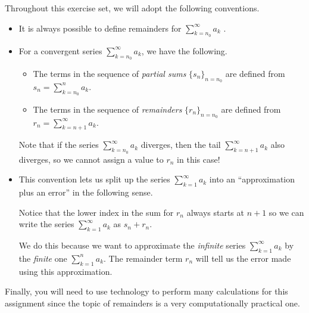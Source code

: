 \documentclass{ximera}
\author{Jim Talamo}
\begin{document}
\begin{exercise}
Throughout this exercise set, we will adopt the following conventions.

\begin{itemize}
\item It is always possible to define remainders for $\sum_{k=n_0}^{\infty} a_k$  . 
\item For a convergent series $\sum_{k=n_0}^{\infty} a_k$, we have the following.

\begin{itemize}
\item The terms in the sequence of \emph{partial sums} $\{s_n\}_{n=n_0}$ are defined from $s_n = \sum_{k=n_0}^n a_k.$
\item  The terms in the sequence of \emph{remainders} $\{r_n\}_{n=n_0}$ are defined from $r_n = \sum_{k=n+1}^\infty a_k.$
\end{itemize}

Note that if the series $\sum_{k=n_0}^{\infty} a_k$ diverges, then the tail $\sum_{k=n+1}^{\infty} a_k$ also diverges, so we cannot assign a value to $r_n$ in this case!

\item This convention lets us split up the series $\sum_{k=1}^{\infty} a_k$ into an ``approximation plus an error'' in the following sense.

\begin{image}
  \end{image}
  
Notice that the lower index in the sum for $r_n$ always starts at $n+1$ so we can write the series $ \sum_{k=1}^{\infty} a_k$ as $s_n +r_n$.
  
  We do this because we want to approximate the \emph{infinite} series $\sum_{k=1}^{\infty} a_k$ by the \emph{finite} one $ \sum_{k=1}^{n} a_k$.  The remainder term $r_n$ will tell us the error made using this approximation.

\end{itemize}

Finally, you will need to use technology to perform many calculations for this assignment since the topic of remainders is a very computationally practical one. 
\end{exercise}
\end{document}
